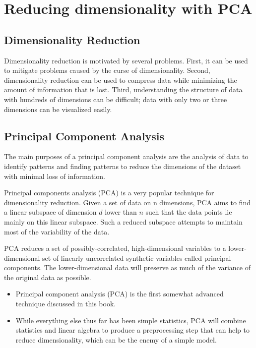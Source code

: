 \documentclass[SKL-MASTER.tex]{subfiles}
\begin{document}
	\Large
\section*{Reducing dimensionality with PCA}

\subsection*{Dimensionality Reduction}
Dimensionality reduction is motivated by
several problems. First, it can be used to mitigate problems caused by the curse of
dimensionality. Second, dimensionality reduction can be used to compress data while
minimizing the amount of information that is lost. Third, understanding the structure
of data with hundreds of dimensions can be difficult; data with only two or three
dimensions can be visualized easily.

\subsection*{Principal Component Analysis}
\begin{framed}
\noindent The main purposes of a principal component analysis are the analysis of data to identify patterns and finding patterns to 
	reduce the dimensions of the dataset with minimal loss of information.
	
\end{framed}
	Principal components analysis (PCA) is a very popular technique for dimensionality reduction.
	Given a set of data on n dimensions, PCA aims to find a linear subspace of dimension
	$d$ lower than $n$ such that the data points lie mainly on this linear subspace. Such a reduced subspace
	attempts to maintain most of the variability of the data.

\begin{framed}	
PCA reduces
	a set of possibly-correlated, high-dimensional variables to a lower-dimensional
	set of linearly uncorrelated synthetic variables called principal components. The
	lower-dimensional data will preserve as much of the variance of the original data
	as possible.


	\end{framed}
\begin{itemize}
\item Principal component analysis (PCA) is the first
somewhat advanced technique discussed in this book. \item While everything else thus far has been
simple statistics, PCA will combine statistics and linear algebra to produce a preprocessing step
that can help to reduce dimensionality, which can be the enemy of a simple model.
\end{itemize}
\end{document}

